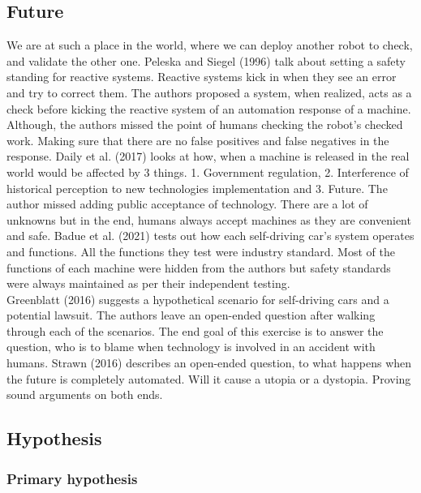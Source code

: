 \documentclass[
  english,
  man]{apa7}
\begin{document}
\hypertarget{future}{%
\subsection{Future}\label{future}}

We are at such a place in the world, where we can deploy another robot to check, and validate the other one. Peleska and Siegel (1996) talk about setting a safety standing for reactive systems. Reactive systems kick in when they see an error and try to correct them. The authors proposed a system, when realized, acts as a check before kicking the reactive system of an automation response of a machine. Although, the authors missed the point of humans checking the robot's checked work. Making sure that there are no false positives and false negatives in the response. Daily et al. (2017) looks at how, when a machine is released in the real world would be affected by 3 things. 1. Government regulation, 2. Interference of historical perception to new technologies implementation and 3. Future. The author missed adding public acceptance of technology. There are a lot of unknowns but in the end, humans always accept machines as they are convenient and safe. Badue et al. (2021) tests out how each self-driving car's system operates and functions. All the functions they test were industry standard. Most of the functions of each machine were hidden from the authors but safety standards were always maintained as per their independent testing.\\
Greenblatt (2016) suggests a hypothetical scenario for self-driving cars and a potential lawsuit. The authors leave an open-ended question after walking through each of the scenarios. The end goal of this exercise is to answer the question, who is to blame when technology is involved in an accident with humans. Strawn (2016) describes an open-ended question, to what happens when the future is completely automated. Will it cause a utopia or a dystopia. Proving sound arguments on both ends.

\hypertarget{hypothesis}{%
\subsection{Hypothesis}\label{hypothesis}}

\hypertarget{primary-hypothesis}{%
\subsubsection{Primary hypothesis}\label{primary-hypothesis}}
\end{document}

